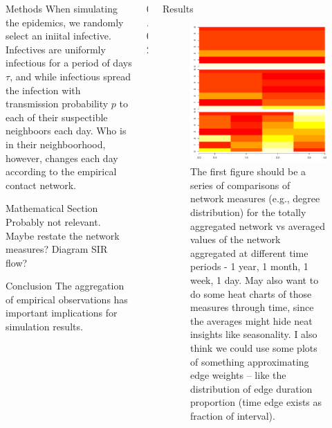 \documentclass[final]{beamer} %
\newcommand{\spaceProp}{0.02}
\newcommand{\spacer}{\begin{column}{\spaceProp\paperwidth}\end{column}}
\newenvironment{oneCol}{\begin{column}[t]{0.225\paperwidth}}{\end{column}}
\newenvironment{threeCol}{\begin{column}[t]{0.715\paperwidth}}{\end{column}}
\begin{document}
\begin{frame}{}
\begin{columns}[t]
\begin{oneCol}
\begin{block}{Methods}
When simulating the epidemics, we randomly select an iniital infective.  Infectives are uniformly infectious for a period of days $\tau$, and while infectious spread the infection with transmission probability $p$ to each of their suspectible neighboors each day.  Who is in their neighboorhood, however, changes each day according to the empirical contact network.
    \end{block}
    \begin{block}{Mathematical Section}
Probably not relevant.  Maybe restate the network measures?  Diagram SIR flow?
    \end{block}
    \begin{block}{Conclusion}
The aggregation of empirical observations has important implications for simulation results.
    \end{block}
    \end{oneCol}
    \spacer{}
    \begin{threeCol}
    \begin{block}{Results}
    \begin{figure}
\includegraphics{poster-plotfig1}
    \caption{The first figure should be a series of comparisons of network measures (e.g., degree distribution) for the totally aggregated network vs averaged values of the network aggregated at different time periods - 1 year, 1 month, 1 week, 1 day.  May also want to do some heat charts of those measures through time, since the averages might hide neat insights like seasonality.  I also think we could use some plots of something approximating edge weights -- like the distribution of edge duration proportion (time edge exists as fraction of interval).}

\end{figure}
\end{block}
\end{threeCol}
\end{columns}
\end{frame}
\end{document}
